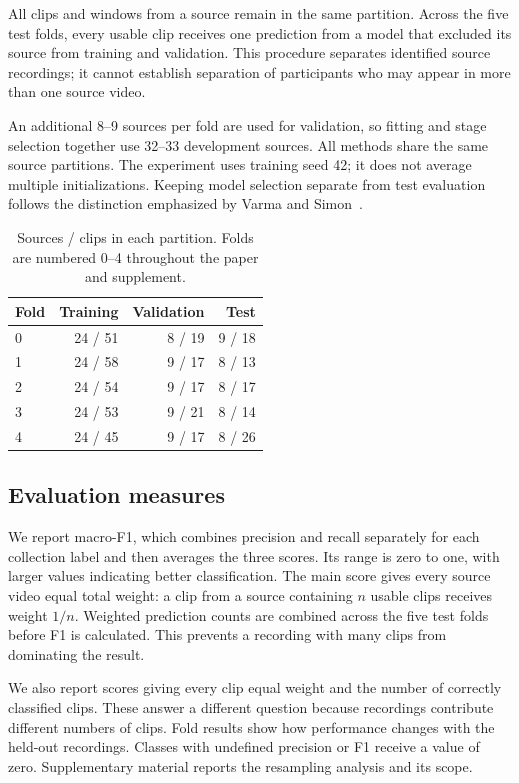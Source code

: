 \documentclass[10pt,twocolumn,letterpaper]{article}
\begin{document}
All clips and windows from a source remain in the same partition. Across the five test folds, every usable clip receives one prediction from a model that excluded its source from training and validation. This procedure separates identified source recordings; it cannot establish separation of participants who may appear in more than one source video.


An additional 8--9 sources per fold are used for validation, so fitting and stage selection together use 32--33 development sources. All methods share the same source partitions. The experiment uses training seed 42; it does not average multiple initializations. Keeping model selection separate from test evaluation follows the distinction emphasized by Varma and Simon~\cite{varma2006}.

\begin{table}[t]
\centering\small
\setlength{\tabcolsep}{5pt}
\begin{tabular}{lrrr}
\toprule
Fold & Training & Validation & Test\\
\midrule
0 & 24 / 51 & 8 / 19 & 9 / 18\\
1 & 24 / 58 & 9 / 17 & 8 / 13\\
2 & 24 / 54 & 9 / 17 & 8 / 17\\
3 & 24 / 53 & 9 / 21 & 8 / 14\\
4 & 24 / 45 & 9 / 17 & 8 / 26\\
\bottomrule
\end{tabular}
\caption{Sources / clips in each partition. Folds are numbered 0--4 throughout the paper and supplement.}
\label{tab:source_partitions}
\end{table}

\subsection{Evaluation measures}
We report macro-F1, which combines precision and recall separately for each collection label and then averages the three scores. Its range is zero to one, with larger values indicating better classification. The main score gives every source video equal total weight: a clip from a source containing $n$ usable clips receives weight $1/n$. Weighted prediction counts are combined across the five test folds before F1 is calculated. This prevents a recording with many clips from dominating the result.

We also report scores giving every clip equal weight and the number of correctly classified clips. These answer a different question because recordings contribute different numbers of clips. Fold results show how performance changes with the held-out recordings. Classes with undefined precision or F1 receive a value of zero. Supplementary material reports the resampling analysis and its scope.
\end{document}
